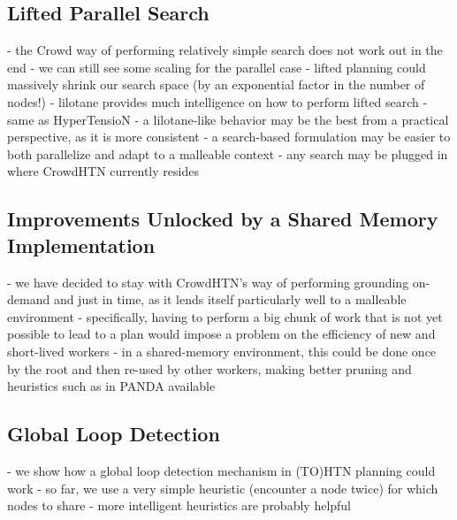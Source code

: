 \subsection{Lifted Parallel Search}
- the Crowd way of performing relatively simple search does not work out in the end
- we can still see some scaling for the parallel case
- lifted planning could massively shrink our search space (by an exponential factor in the number of nodes!)
- lilotane provides much intelligence on how to perform lifted search
- same as HyperTensioN
- a lilotane-like behavior may be the best from a practical perspective, as it is more consistent
- a search-based formulation may be easier to both parallelize and adapt to a malleable context - any search may be plugged in where CrowdHTN currently resides

\subsection{Improvements Unlocked by a Shared Memory Implementation}
- we have decided to stay with CrowdHTN's way of performing grounding on-demand and just in time, as it lends itself particularly well to a malleable environment
- specifically, having to perform a big chunk of work that is not yet possible to lead to a plan would impose a problem on the efficiency of new and short-lived workers
- in a shared-memory environment, this could be done once by the root and then re-used by other workers, making better pruning and heuristics such as in PANDA available

\subsection{Global Loop Detection}
- we show how a global loop detection mechanism in (TO)HTN planning could work
- so far, we use a very simple heuristic (encounter a node twice) for which nodes to share
- more intelligent heuristics are probably helpful
